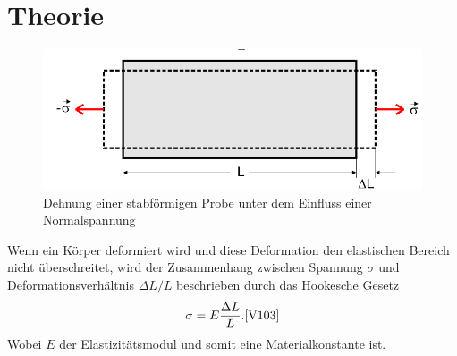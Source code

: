 \section{Theorie}
\label{sec:Theorie}




\begin{figure}
    \centering
    \includegraphics[width=\textwidth/2]{images/skizze_1.png}
    \caption{Dehnung einer stabförmigen Probe unter dem Einfluss einer Normalspannung\cite{V103}}
    \label{fig:skizze_1}
\end{figure}
Wenn ein Körper deformiert wird und diese Deformation den elastischen Bereich nicht überschreitet, wird der Zusammenhang zwischen Spannung $\sigma$ und Deformationsverhältnis $\Delta L / L$ beschrieben durch das Hookesche Gesetz
\begin{equation}
    \sigma = E \frac{\Delta L}{L}.\text{\cite{V103}}
    \label{eq:hookesches_gesetz}
\end{equation}
Wobei $E$ der Elastizitätsmodul und somit eine Materialkonstante ist.

